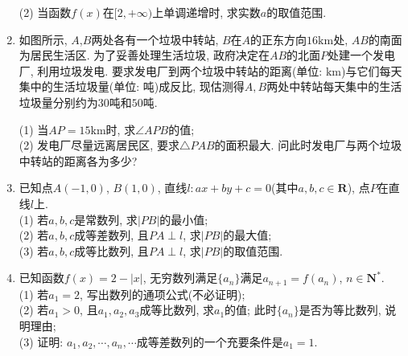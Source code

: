 \documentclass[10pt,a4paper]{article}
\begin{document}
\begin{enumerate}[1.]
(2) 当函数$f(x)$在$[2,+\infty)$上单调递增时, 求实数$a$的取值范围.
\item 如图所示, $A$,$B$两处各有一个垃圾中转站, $B$在$A$的正东方向$16\text{km}$处, $AB$的南面为居民生活区. 为了妥善处理生活垃圾, 政府决定在$AB$的北面$P$处建一个发电厂, 利用垃圾发电. 要求发电厂到两个垃圾中转站的距离(单位: $\text{km}$)与它们每天集中的生活垃圾量(单位: 吨)成反比, 现估测得$A,B$两处中转站每天集中的生活垃圾量分别约为$30$吨和$50$吨.
\begin{center}
\end{center}
(1) 当$AP=15\text{km}$时, 求$\angle APB$的值;\\
(2) 发电厂尽量远离居民区, 要求$\triangle PAB$的面积最大. 问此时发电厂与两个垃圾中转站的距离各为多少?
\item 已知点$A(-1,0)$, $B(1,0)$, 直线$l:ax+by+c=0$(其中$a,b,c\in \mathbf{R}$), 点$P$在直线$l$上.\\
(1) 若$a,b,c$是常数列, 求$|PB|$的最小值;\\
(2) 若$a,b,c$成等差数列, 且$PA\perp l$, 求$|PB|$的最大值;\\
(3) 若$a,b,c$成等比数列, 且$PA\perp l$, 求$|PB|$的取值范围.
\item 已知函数$f(x)=2-|x|$, 无穷数列满足$\{a_n\}$满足$a_{n+1}=f(a_n)$, $n\in \mathbf{N}^*$.\\
(1) 若$a_1=2$, 写出数列的通项公式(不必证明);\\
(2) 若$a_1>0$, 且$a_1,a_2,a_3$成等比数列, 求$a_1$的值; 此时$\{a_n\}$是否为等比数列, 说明理由;\\
(3) 证明: $a_1,a_2,\cdots,a_n,\cdots$成等差数列的一个充要条件是$a_1=1$.


\end{enumerate}
\end{document}

